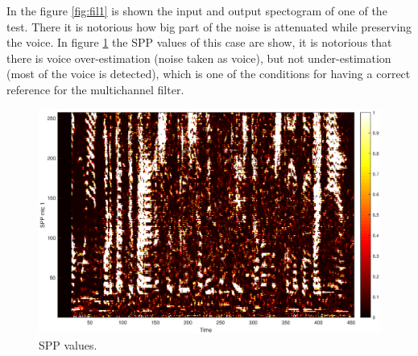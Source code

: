 In the figure \ref{fig:fil1} is shown the input and output spectogram of one of the test. There it is notorious how big part of the noise is attenuated while preserving the voice. In figure \ref{fig:SPP32} the SPP values of this case are show, it is notorious that there is voice over-estimation (noise taken as voice), but not under-estimation (most of the voice is detected), which is one of the conditions for having a correct reference for the multichannel filter.\\

\begin{figure}[!ht]
  \centering
	\includegraphics[width=120mm]{Kap4/SPP32}
	\caption{SPP values.}
	\label{fig:SPP32}
\end{figure}





